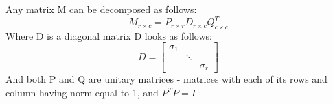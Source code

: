 {
    Any matrix M can be decomposed as follows:
    \begin{equation}
        M_{r\times c} = P_{r\times r} D_{r\times c} Q^{T}_{c\times c}
    \end{equation}
    Where D is a diagonal matrix D looks as follows:
    \begin{equation}
        D = \begin{bmatrix}
            \sigma_1 & & \\
                     & \ddots & \\
                     & & \sigma_r
        \end{bmatrix}
    \end{equation}
    And both P and Q  are unitary matrices - matrices with each of its rows and column having norm equal to 1, and $P^{T}P = I$
}



